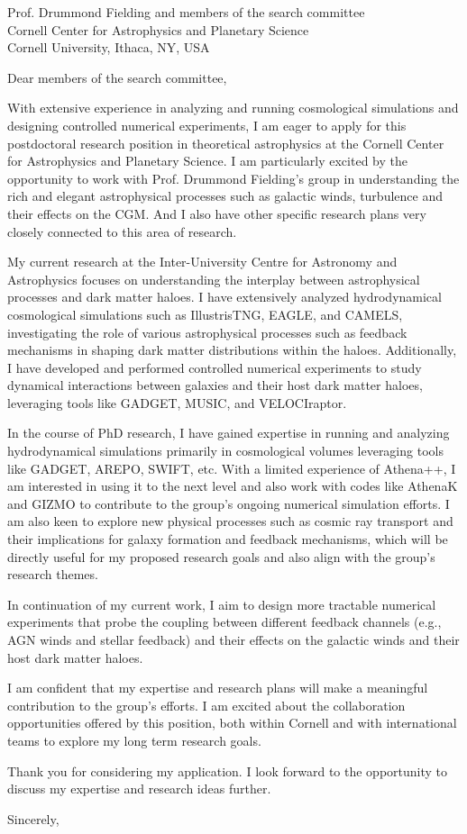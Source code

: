\documentclass[11pt]{letter}
\begin{document}
\begin{letter}{Prof. Drummond Fielding and members of the search committee \\ Cornell Center for Astrophysics and Planetary Science \\ Cornell University, Ithaca, NY, USA}

\opening{Dear members of the search committee,}


With extensive experience in analyzing and running cosmological simulations and designing controlled numerical experiments, I am eager to apply for this postdoctoral research position in theoretical astrophysics at the Cornell Center for Astrophysics and Planetary Science. I am particularly excited by the opportunity to work with Prof. Drummond Fielding's group in understanding the rich and elegant astrophysical processes such as galactic winds, turbulence and their effects on the CGM. And I also have other specific research plans very closely connected to this area of research.

My current research at the Inter-University Centre for Astronomy and Astrophysics focuses on understanding the interplay between astrophysical processes and dark matter haloes. I have extensively analyzed hydrodynamical cosmological simulations such as IllustrisTNG, EAGLE, and CAMELS, investigating the role of various astrophysical processes such as feedback mechanisms in shaping dark matter distributions within the haloes. Additionally, I have developed and performed controlled numerical experiments to study dynamical interactions between galaxies and their host dark matter haloes, leveraging tools like GADGET, MUSIC, and VELOCIraptor.  

In the course of PhD research, I have gained expertise in running and analyzing hydrodynamical simulations primarily in cosmological volumes leveraging tools like GADGET, AREPO, SWIFT, etc. With a limited experience of Athena++, I am interested in using it to the next level and also work with codes like AthenaK and GIZMO to contribute to the group's ongoing numerical simulation efforts. I am also keen to explore new physical processes such as cosmic ray transport and their implications for galaxy formation and feedback mechanisms, which will be directly useful for my proposed research goals and also align with the group's research themes.

In continuation of my current work, I aim to design more tractable numerical experiments that probe the coupling between different feedback channels (e.g., AGN winds and stellar feedback) and their effects on the galactic winds and their host dark matter haloes.  

I am confident that my expertise and research plans will make a meaningful contribution to the group's efforts. I am excited about the collaboration opportunities offered by this position, both within Cornell and with international teams to explore my long term research goals.

Thank you for considering my application. I look forward to the opportunity to discuss my expertise and research ideas further.  

\closing{Sincerely,}

\end{letter}
\end{document}
